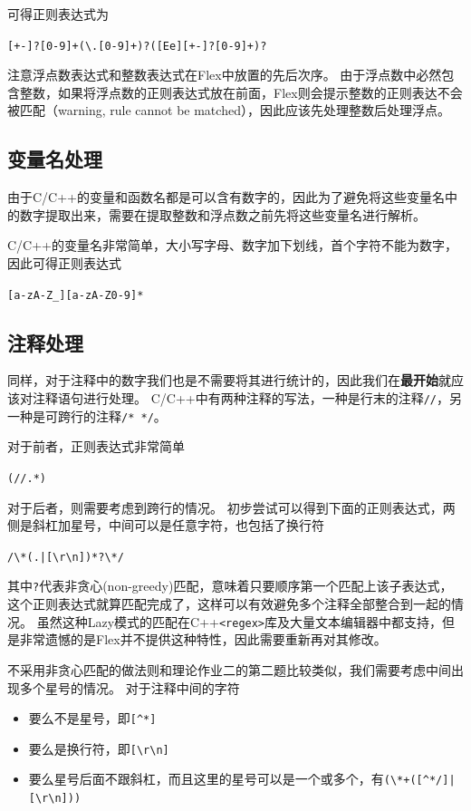 \documentclass[logo,reportComp]{thesis}
\begin{document}
可得正则表达式为
\begin{center}
\verb'[+-]?[0-9]+(\.[0-9]+)?([Ee][+-]?[0-9]+)?'
\end{center}

注意浮点数表达式和整数表达式在Flex中放置的先后次序。
由于浮点数中必然包含整数，如果将浮点数的正则表达式放在前面，Flex则会提示整数的正则表达不会被匹配（warning, rule cannot be matched），因此应该先处理整数后处理浮点。

\subsection{变量名处理}
由于C/C++的变量和函数名都是可以含有数字的，因此为了避免将这些变量名中的数字提取出来，需要在提取整数和浮点数之前先将这些变量名进行解析。

C/C++的变量名非常简单，大小写字母、数字加下划线，首个字符不能为数字，因此可得正则表达式
\begin{center}
\verb'[a-zA-Z_][a-zA-Z0-9]*'
\end{center}

\subsection{注释处理}
同样，对于注释中的数字我们也是不需要将其进行统计的，因此我们在\textbf{最开始}就应该对注释语句进行处理。
C/C++中有两种注释的写法，一种是行末的注释\verb'//'，另一种是可跨行的注释\verb'/* */'。

对于前者，正则表达式非常简单
\begin{center}
\verb'(//.*)'
\end{center}

对于后者，则需要考虑到跨行的情况。
初步尝试可以得到下面的正则表达式，两侧是斜杠加星号，中间可以是任意字符，也包括了换行符
\begin{center}
\verb'/\*(.|[\r\n])*?\*/'
\end{center}
其中\verb'?'代表非贪心(non-greedy)匹配，意味着只要顺序第一个匹配上该子表达式，这个正则表达式就算匹配完成了，这样可以有效避免多个注释全部整合到一起的情况。
虽然这种Lazy模式的匹配在C++\verb'<regex>'库及大量文本编辑器中都支持，但是非常遗憾的是Flex并不提供这种特性，因此需要重新再对其修改。

不采用非贪心匹配的做法则和理论作业二的第二题比较类似，我们需要考虑中间出现多个星号的情况。
对于注释中间的字符
\begin{itemize}
	\item 要么不是星号，即\verb'[^*]'
	\item 要么是换行符，即\verb'[\r\n]'
	\item 要么星号后面不跟斜杠，而且这里的星号可以是一个或多个，有\verb'(\*+([^*/]|[\r\n]))'
\end{itemize}
\end{document}
